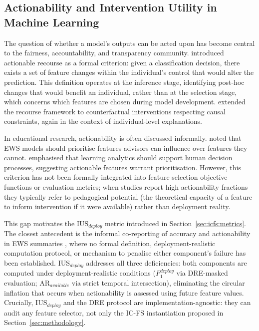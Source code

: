 \documentclass[a4paper,fleqn]{cas-sc}
\begin{document}
\subsection{Actionability and Intervention Utility in Machine Learning}
\label{sec:related_work:actionability}
 
The question of whether a model's outputs can be acted upon has become central to the fairness, accountability, and transparency community. \citet{ustun2019} introduced actionable recourse as a formal criterion: given a classification decision, there exists a set of feature changes within the individual's control that would alter the prediction. This definition operates at the inference stage, identifying post-hoc changes that would benefit an individual, rather than at the selection stage, which concerns which features are chosen during model development. \citet{karimi2020} extended the recourse framework to counterfactual interventions respecting causal constraints, again in the context of individual-level explanations.
 
In educational research, actionability is often discussed informally. \citet{baker2014} noted that EWS models should prioritise features advisors can influence over features they cannot. \citet{siemens2012} emphasised that learning analytics should support human decision processes, suggesting actionable features warrant prioritisation. However, this criterion has not been formally integrated into feature selection objective functions or evaluation metrics; when studies report high actionability fractions they typically refer to pedagogical potential (the theoretical capacity of a feature to inform intervention if it were available) rather than deployment reality.
 
This gap motivates the $\mathrm{IUS}_{deploy}$ metric introduced in Section~\ref{sec:icfs:metrics}. The closest antecedent is the informal co-reporting of accuracy and
actionability in EWS summaries \citep{arnold2012,jayaprakash2014, herodotou2023}, where no formal definition, deployment-realistic computation protocol, or mechanism to penalise either component's failure has been established. $\mathrm{IUS}_{deploy}$ addresses all three deficiencies: both components are computed under deployment-realistic conditions ($F_1^{deploy}$ via DRE-masked evaluation; $\mathrm{AR}_{available}$ via strict temporal intersection), eliminating the circular inflation that occurs when actionability is assessed using future feature values. Crucially, $\mathrm{IUS}_{deploy}$ and the DRE protocol are implementation-agnostic: they can audit any feature selector, not only the IC-FS instantiation proposed in Section~\ref{sec:methodology}.
\end{document}
